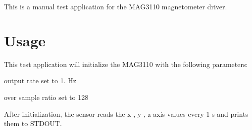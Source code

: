 This is a manual test application for the M\+A\+G3110 magnetometer driver.

\section*{Usage}

This test application will initialize the M\+A\+G3110 with the following parameters\+:
\begin{DoxyItemize}
\item output rate set to 1. Hz
\item over sample ratio set to 128
\end{DoxyItemize}

After initialization, the sensor reads the x-\/, y-\/, z-\/axis values every 1 s and prints them to S\+T\+D\+O\+UT. 